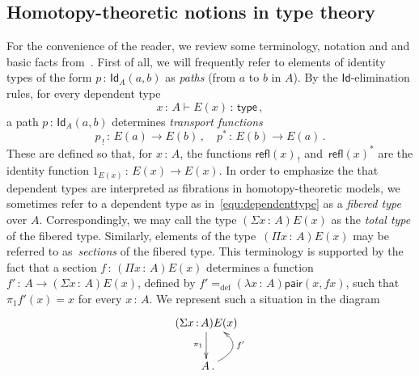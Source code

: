 \documentclass[10pt,a4paper,oneside,reqno]{amsart}
\numberwithin{equation}{section}
\theoremstyle{mythm}
\theoremstyle{mydef}
\theoremstyle{myrmk}
\newcommand{\defeq}{=_{\mathrm{def}}}
\newcommand{\co}{\,{:}\,}
\newcommand{\type}{\mathsf{type}}
\newcommand{\Id}{\mathsf{Id}}
\newcommand{\refl}{\mathsf{refl}}
\newcommand{\pair}{\mathsf{pair}}
\begin{document}
\subsection{Homotopy-theoretic notions in type theory} For the convenience of the reader, 
we review some terminology, notation and  and basic facts from~\cite{HoTT,VoevodskyV:notts}. 
First of all, we will frequently refer to elements of identity types of the form 
$p \co \Id_A(a,b)$ as \emph{paths} (from $a$ to $b$ in $A$). By the $\Id$-elimination rules, 
for every dependent type
\begin{equation}
\label{equ:dependenttype}
x\co A \vdash E(x) \co \type \, ,
\end{equation} 
a path $p\co \Id_A(a,b)$ determines \emph{transport functions} 
\[
p_{\, ! } \co E(a) \rightarrow E(b) \, , \quad p^* \co E(b) \to E(a) \, .
\] 
These are defined so that, for $x \co A$, the functions $\refl(x)_{\, !}$ 
and~$\refl(x)^*$ are the identity function $1_{E(x)} \co E(x) \to E(x)$.  In order to emphasize the 
that dependent types are interpreted as fibrations in homotopy-theoretic models, we sometimes refer to a dependent
type as in~\eqref{equ:dependenttype} as a \emph{fibered type} over $A$. Correspondingly, we may call
the type $(\Sigma x \co A)E(x)$ as the \emph{total type} of the fibered type. Similarly, elements of the 
type~$(\Pi x \co A)E(x)$ may be referred to as~\emph{sections} of the fibered type. This terminology is supported by the fact that a section $f \co (\Pi x \co A)E(x)$ determines a function $f' \co A \to (\Sigma x \co A)E(x)$, defined by
$f' \defeq (\lambda x \co A) \pair(x, fx)$, such that $ \pi_1 f'(x) = x$ for every $x \co A$.  We represent such a situation in the diagram
  \[
   \xymatrix{
    (\Sigma x \co A) E(x) \ar[d]_{\pi_1} \\
    \;  A \, . \ar@/_2pc/[u]_{f'} }
     \]
\end{document}
